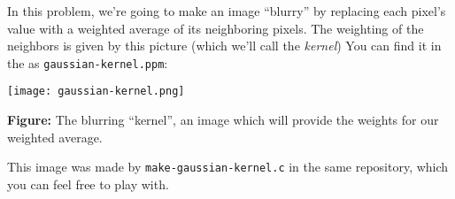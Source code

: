 
\bigskip
{}

In this problem, we're going to make an image ``blurry'' by replacing
each pixel's value with a weighted average of its neighboring pixels.
The weighting of the neighbors is given by this picture (which we'll call the
\emph{kernel}) You can find it in the
as \texttt{gaussian-kernel.ppm}:
\begin{center}
  \texttt{[image: gaussian-kernel.png]}

  \textbf{Figure:} The blurring ``kernel'', an
  image which will provide the weights for our weighted
  average.
\end{center}
This image was made by \texttt{make-gaussian-kernel.c} in the same
repository, which you can feel free to play with.


